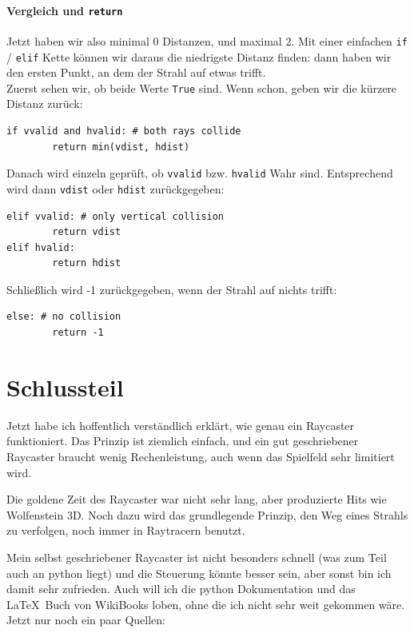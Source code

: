 \documentclass[a4paper,12pt]{report}
\newcommand{\mychapter}[2]{
    \setcounter{chapter}{#1}
    \setcounter{section}{0}
    \chapter*{#2}
    \addcontentsline{toc}{chapter}{#2}
}
\begin{document}
\subsubsection{Vergleich und \texttt{return}}
Jetzt haben wir also minimal 0 Distanzen, und maximal 2. Mit einer einfachen \texttt{if} / \texttt{elif} Kette k\"onnen wir daraus die niedrigste Distanz finden: dann haben wir den ersten Punkt, an dem der Strahl auf etwas trifft. \\
Zuerst sehen wir, ob beide Werte \texttt{True} sind. Wenn schon, geben wir die k\"urzere Distanz zur\"uck:
\begin{Verbatim}[baselinestretch=1.0, xleftmargin=1cm]
if vvalid and hvalid: # both rays collide
        return min(vdist, hdist)
\end{Verbatim}
Danach wird einzeln gepr\"uft, ob \texttt{vvalid} bzw. \texttt{hvalid} Wahr sind. Entsprechend wird dann \texttt{vdist} oder \texttt{hdist} zur\"uckgegeben:
\begin{Verbatim}[baselinestretch=1.0, xleftmargin=1cm]
elif vvalid: # only vertical collision
        return vdist
elif hvalid:
        return hdist
\end{Verbatim}
Schlie\ss lich wird -1 zur\"uckgegeben, wenn der Strahl auf nichts trifft:
\begin{Verbatim}[baselinestretch=1.0, xleftmargin=1cm]
else: # no collision
        return -1
\end{Verbatim}

\begingroup
\renewcommand{\cleardoublepage}{}
\renewcommand{\clearpage}{}

\mychapter{3}{Schlussteil}
Jetzt habe ich hoffentlich verst\"andlich erkl\"art, wie genau ein Raycaster funktioniert. Das Prinzip ist ziemlich einfach, und ein gut geschriebener Raycaster braucht wenig Rechenleistung, auch wenn das Spielfeld sehr limitiert wird.

Die goldene Zeit des Raycaster war nicht sehr lang, aber produzierte Hits wie Wolfenstein 3D. Noch dazu wird das grundlegende Prinzip, den Weg eines Strahls zu verfolgen, noch immer in Raytracern benutzt.

Mein selbst geschriebener Raycaster ist nicht besonders schnell (was zum Teil auch an python liegt) und die Steuerung k\"onnte besser sein, aber sonst bin ich damit sehr zufrieden. Auch will ich die python Dokumentation und das \LaTeX\ Buch von WikiBooks loben, ohne die ich nicht sehr weit gekommen w\"are. Jetzt nur noch ein paar Quellen:
\endgroup
\end{document}
